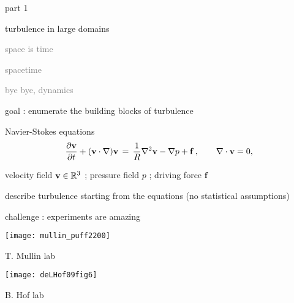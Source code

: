 \begin{frame}{part 1}
\begin{enumerate}
              \item {\Large
turbulence in large domains
                  }\textcolor{gray}{\small
              \item
space is time
              \item
spacetime
              \item
bye bye, dynamics
                    }
            \end{enumerate}
\end{frame}


\begin{frame}{goal : enumerate the building blocks of turbulence}
\begin{block}{Navier-Stokes equations} %
\[
\dfrac{\partial {\bf v}}{\partial t} + ({\bf v} \cdot \nabla) {\bf v}
	\,=\,
\frac{1}{R} \nabla ^2 {\bf v}
-\nabla p
+ \mathbf{f}
    \,,\qquad
\nabla \cdot {\bf v} = 0,
\]
\end{block}

\hfill{\small
velocity field  ${\bf v} \in \mathbb{R}^3$
;
pressure field $p$
;
driving force $\mathbf{f}$
        }

\medskip

\begin{block}{describe turbulence}
starting from the equations (no statistical assumptions)
\end{block}

\bigskip

\hfill {\Large\textcolor{red}{}}

\end{frame}

\begin{frame}{challenge : experiments are amazing}
\begin{center}
\texttt{[image: mullin\_puff2200]} %
\end{center}
T. Mullin lab
\begin{center}
\bigskip
\texttt{[image: deLHof09fig6]} %
\end{center}
B. Hof lab
\end{frame}


